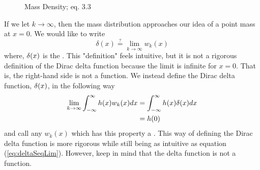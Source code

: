 \begin{figure}
    \centering
    \caption{Mass Density;  eq. 3.3}
\end{figure}

If we let \(k \rightarrow \infty\), then the mass distribution approaches our idea of a point mass at \(x=0\). We would like to write
\begin{equation} \label{eq:deltaSeqLim}
    \delta(x) \overset{?}{=} \lim_{k\rightarrow \infty} w_k(x)
\end{equation}
where, \(\delta(x)\) is the . This "definition" feels intuitive, but it is not a rigorous definition of the Dirac delta function because the limit is infinite for \(x=0\). That is, the right-hand side is not a function. We instead define the Dirac delta function, \(\delta(x)\), in the following way
\begin{equation}\label{eq:seqDef}
    \begin{split}
        \lim_{k\rightarrow \infty}\int_{-\infty}^{\infty} h(x)w_k(x)dx &= \int_{-\infty}^{\infty} h(x)\delta(x)dx \\
        &= h(0)
    \end{split}
\end{equation}
and call any \(w_k(x)\) which has this property a . This way of defining the Dirac delta function is more rigorous while still being as intuitive as equation (\ref{eq:deltaSeqLim}). However, keep in mind that the delta function is not a function.

